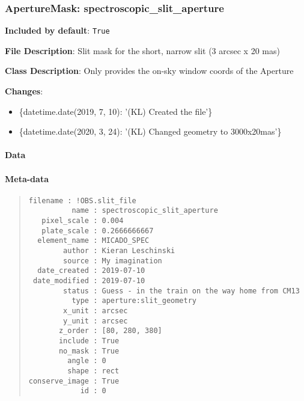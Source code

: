 \subsubsection{ApertureMask: \textquotedbl{}spectroscopic\_slit\_aperture\textquotedbl{}%
  \label{aperturemask-spectroscopic-slit-aperture}%
}

\textbf{Included by default}: \texttt{True}

\textbf{File Description}: Slit mask for the short, narrow slit (3 arcsec x 20 mas)

\textbf{Class Description}: Only provides the on-sky window coords of the Aperture

\textbf{Changes}:

\begin{itemize}
\item \{datetime.date(2019, 7, 10): '(KL) Created the file'\}

\item \{datetime.date(2020, 3, 24): '(KL) Changed geometry to 3000x20mas'\}
\end{itemize}


\paragraph{Data%
  \label{id1}%
}


\paragraph{Meta-data%
  \label{id2}%
}

\begin{quote}
\begin{alltt}
\begin{lstlisting}[frame=single]
      filename : !OBS.slit_file
          name : spectroscopic_slit_aperture
   pixel_scale : 0.004
   plate_scale : 0.2666666667
  element_name : MICADO_SPEC
        author : Kieran Leschinski
        source : My imagination
  date_created : 2019-07-10
 date_modified : 2019-07-10
        status : Guess - in the train on the way home from CM13
          type : aperture:slit_geometry
        x_unit : arcsec
        y_unit : arcsec
       z_order : [80, 280, 380]
       include : True
       no_mask : True
         angle : 0
         shape : rect
conserve_image : True
            id : 0
\end{lstlisting}
\end{alltt}
\end{quote}

